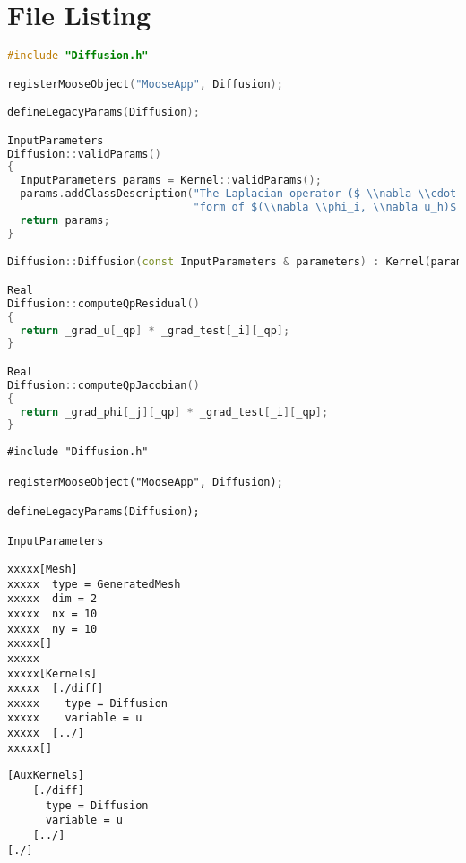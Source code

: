 \section{\label{file-listing}File Listing}
\begin{lstlisting}[language=C++,label=diffusion-c,caption=\mbox{}]
#include "Diffusion.h"

registerMooseObject("MooseApp", Diffusion);

defineLegacyParams(Diffusion);

InputParameters
Diffusion::validParams()
{
  InputParameters params = Kernel::validParams();
  params.addClassDescription("The Laplacian operator ($-\\nabla \\cdot \\nabla u$), with the weak "
                             "form of $(\\nabla \\phi_i, \\nabla u_h)$.");
  return params;
}

Diffusion::Diffusion(const InputParameters & parameters) : Kernel(parameters) {}

Real
Diffusion::computeQpResidual()
{
  return _grad_u[_qp] * _grad_test[_i][_qp];
}

Real
Diffusion::computeQpJacobian()
{
  return _grad_phi[_j][_qp] * _grad_test[_i][_qp];
}
\end{lstlisting}

\begin{verbatim}
#include "Diffusion.h"

registerMooseObject("MooseApp", Diffusion);

defineLegacyParams(Diffusion);

InputParameters
\end{verbatim}

\begin{verbatim}
xxxxx[Mesh]
xxxxx  type = GeneratedMesh
xxxxx  dim = 2
xxxxx  nx = 10
xxxxx  ny = 10
xxxxx[]
xxxxx
xxxxx[Kernels]
xxxxx  [./diff]
xxxxx    type = Diffusion
xxxxx    variable = u
xxxxx  [../]
xxxxx[]
\end{verbatim}

\begin{verbatim}
[AuxKernels]
    [./diff]
      type = Diffusion
      variable = u
    [../]
[./]
\end{verbatim}
